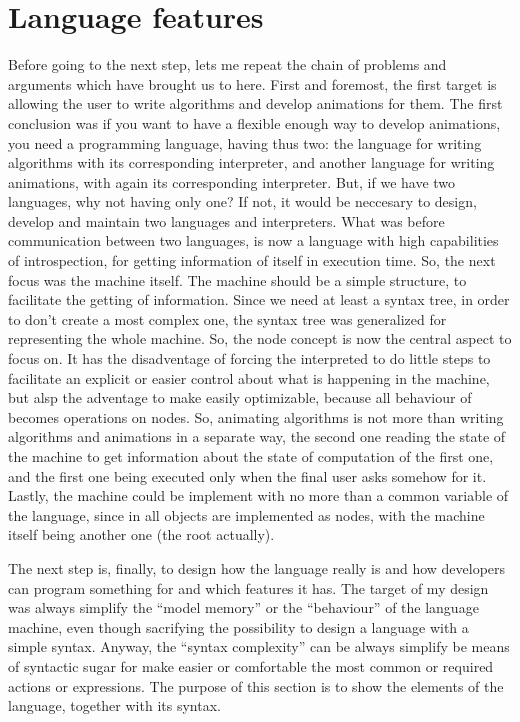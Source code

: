 \documentclass{article}
\begin{document}
\section{Language features}
Before going to the next step, lets me repeat the chain of problems and
arguments which have brought us to here. First and foremost, the first target is
allowing the user to write algorithms and develop animations for them. The first
conclusion was if you want to have a flexible enough way to develop animations,
you need a programming language, having thus two: the language for writing
algorithms with its corresponding interpreter, and another language for writing
animations, with again its corresponding interpreter. But, if we have two
languages, why not having only one? If not, it would be neccesary to design,
develop and maintain two languages and interpreters. What was before
communication between two languages, is now a language with high capabilities of
introspection, for getting information of itself in execution time. So, the next
focus was the machine itself. The machine should be a simple structure, to
facilitate the getting of information. Since we need at least a syntax tree, in
order to don't create a most complex one, the syntax tree was generalized for
representing the whole machine. So, the node concept is now the central aspect
to focus on. It has the disadventage of forcing the interpreted to do little
steps to facilitate an explicit or easier control about what is happening in the
machine, but alsp the adventage to make \fav easily optimizable, because all
behaviour of \fav becomes operations on nodes. So, animating algorithms is not
more than writing algorithms and animations in a separate way, the second one
reading the state of the machine to get information about the state of
computation of the first one, and the first one being executed only when the
final user asks somehow for it. Lastly, the machine could be implement with no
more than a common variable of the language, since in \fav all objects are
implemented as nodes, with the machine itself being another one (the root
actually).

The next step is, finally, to design how the language really is and how
developers can program something for \fav and which features it has. The target
of my design was always simplify the ``model memory'' or the ``behaviour'' of
the language machine, even though sacrifying the possibility to design a
language with a simple syntax. Anyway, the ``syntax complexity'' can be always
simplify be means of syntactic sugar for make easier or comfortable the most
common or required actions or expressions. The purpose of this section is to
show the elements of the language, together with its syntax.
\end{document}
